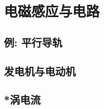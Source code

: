 

\section{电磁感应与电路}\label{19-2}

\subsection{例: 平行导轨}\label{19-2-1}

\subsection{发电机与电动机}\label{19-2-2}

\subsection{*涡电流}\label{19-2-3}
